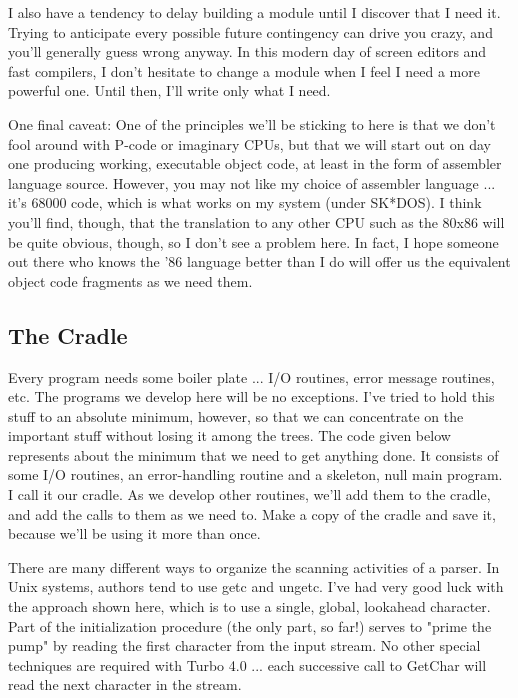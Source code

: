 I  also  have  a  tendency  to  delay  building  a module until I
discover that I need  it.    Trying  to anticipate every possible
future contingency can  drive  you  crazy,  and  you'll generally
guess wrong anyway.    In  this  modern day of screen editors and
fast compilers, I don't hesitate to change a module when I feel I
need a more powerful one.  Until then,  I'll  write  only  what I
need.

One final caveat: One of the principles we'll be sticking to here
is that we don't  fool  around with P-code or imaginary CPUs, but
that we will start out on day one  producing  working, executable
object code, at least in the form of  assembler  language source.
However, you may not  like  my  choice  of assembler language ...
it's 68000 code, which is what works on my system (under SK*DOS).
I  think  you'll  find, though, that the translation to any other
CPU such as the 80x86 will  be  quite obvious, though, so I don't
see  a problem here.  In fact, I hope someone out there who knows
the '86 language better than I do will offer  us  the  equivalent
object code fragments as we need them.

\subsection{The Cradle}
Every program needs some boiler  plate  ...  I/O  routines, error
message routines, etc.   The  programs we develop here will be no
exceptions.    I've  tried to hold  this  stuff  to  an  absolute
minimum, however, so that we  can  concentrate  on  the important
stuff without losing it  among  the  trees.  The code given below
represents about the minimum that we need to  get  anything done.
It consists of some I/O routines, an error-handling routine and a
skeleton, null main program.   I  call  it  our  cradle.    As we
develop other routines, we'll add them to the cradle, and add the
calls to them as we  need to.  Make a copy of the cradle and save
it, because we'll be using it more than once.

There are many different ways to organize the scanning activities
of  a  parser.   In Unix systems, authors tend to  use  getc  and
ungetc.  I've had very good luck with the  approach  shown  here,
which is to use  a  single, global, lookahead character.  Part of
the initialization procedure  (the  only part, so far!) serves to
"prime  the  pump"  by reading the first character from the input
stream.  No other special  techniques are required with Turbo 4.0
... each successive call to  GetChar will read the next character
in the stream.

